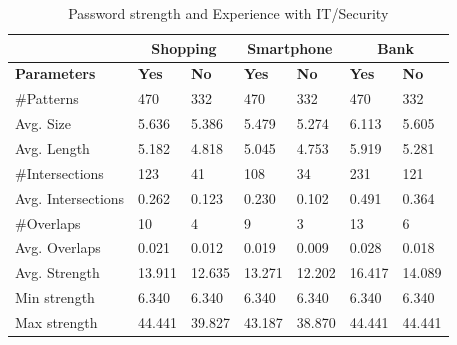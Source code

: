 		\begin{table}[H]
      \centering
      \begin{tabular}{l || l | l || l | l || l | l }
        \hline
         & \multicolumn{2}{c||}{\bf Shopping} & \multicolumn{2}{c||}{\bf Smartphone} &\multicolumn{2}{c}{\bf Bank} \\ \hline
        {\bf Parameters}   & {\bf Yes} & {\bf No} & {\bf Yes} & {\bf No} & {\bf Yes} & {\bf No}\\ \hline
        \#Patterns         & 470    & 332    & 470    & 332    & 470    & 332    \\
        Avg. Size          & 5.636  & 5.386  & 5.479  & 5.274  & 6.113  & 5.605  \\
        Avg. Length        & 5.182  & 4.818  & 5.045  & 4.753  & 5.919  & 5.281  \\
        \#Intersections    & 123    & 41     & 108    & 34     & 231    & 121    \\
        Avg. Intersections & 0.262  & 0.123  & 0.230  & 0.102  & 0.491  & 0.364  \\
        \#Overlaps         & 10     & 4      & 9      & 3      & 13     & 6      \\
        Avg. Overlaps      & 0.021  & 0.012  & 0.019  & 0.009  & 0.028  & 0.018  \\ \hline
        Avg. Strength      & 13.911 & 12.635 & 13.271 & 12.202 & 16.417 & 14.089 \\ 
        Min strength       & 6.340  & 6.340  & 6.340  & 6.340  & 6.340  & 6.340  \\
        Max strength       & 44.441 & 39.827 & 43.187 & 38.870 & 44.441 & 44.441 \\ \hline
      \end{tabular}
      \caption{Password strength and Experience with IT/Security}
      \label{tab:experiencestrength} 
    \end{table}

